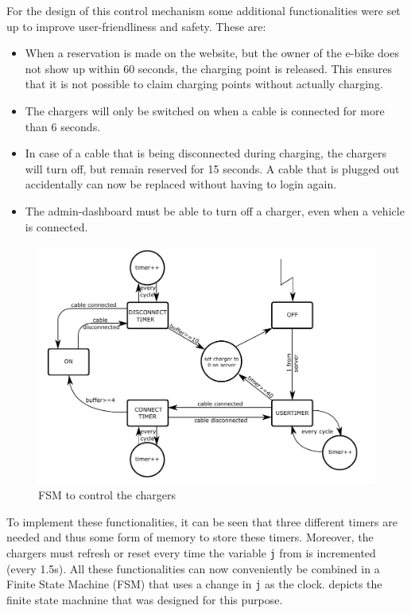 For the design of this control mechanism some additional functionalities were set up to improve user-friendliness and safety. These are:
\begin{itemize}
\item When a reservation is made on the website, but the owner of the e-bike does not show up within 60 seconds, the charging point is released. This ensures that it is not possible to claim charging points without actually charging.
\item The chargers will only be switched on when a cable is connected for more than 6 seconds.
\item In case of a cable that is being disconnected during charging, the chargers will turn off, but remain reserved for 15 seconds. A cable that is plugged out accidentally can now be replaced without having to login again.
\item The admin-dashboard must be able to turn off a charger, even when a vehicle is connected.\\
\end{itemize}

\begin{figure}[!ht]
  \centering
    \includegraphics[width=\textwidth]{images/Charger_Control.pdf}
      \caption{FSM to control the chargers}\label{fig:fsm}
\end{figure}

To implement these functionalities, it can be seen that three different timers are needed and thus some form of memory to store these timers. Moreover, the chargers must refresh or reset every time the variable \verb|j| from  is incremented (every 1.5s). All these functionalities can now conveniently be combined in a Finite State Machine (FSM) that uses a change in \verb|j| as the clock.  depicts the finite state machnine that was designed for this purpose.\\

